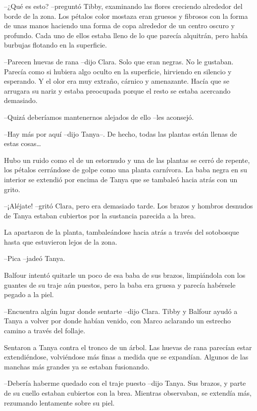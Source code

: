{--¿Qué es esto? --preguntó Tibby, examinando las flores creciendo
 alrededor del borde de la zona. Los pétalos color mostaza eran gruesos y
 fibrosos con la forma de unas manos haciendo una forma de copa alrededor
 de un centro oscuro y profundo. Cada uno de ellos estaba lleno de lo que
parecía alquitrán, pero había burbujas flotando en la superficie.}

{--Parecen huevas de rana --dijo Clara. Solo que eran negras. No le
 gustaban. Parecía como si hubiera algo oculto en la superficie,
 hirviendo en silencio y esperando. Y el olor era muy extraño, cárnico y
 amenazante. Hacía que se arrugara su nariz y estaba preocupada porque el
resto se estaba acercando demasiado.}

{--Quizá deberíamos mantenernos alejados de ello --les aconsejó.}

{--Hay más por aquí --dijo Tanya--. De hecho, todas las plantas están
 llenas de estas cosas\ldots{}}

{Hubo un ruido como el de un estornudo y una de las plantas se cerró de
 repente, los pétalos cerrándose de golpe como una planta carnívora. La
 baba negra en su interior se extendió por encima de Tanya que se
tambaleó hacia atrás con un grito.}

{--¡Aléjate! --gritó Clara, pero era demasiado tarde. Los brazos y
 hombros desnudos de Tanya estaban cubiertos por la sustancia parecida a
la brea.}

{La apartaron de la planta, tambaleándose hacia atrás a través del
sotobosque hasta que estuvieron lejos de la zona.}

{--Pica --jadeó Tanya.}

{Balfour intentó quitarle un poco de esa baba de sus brazos, limpiándola
 con los guantes de su traje aún puestos, pero la baba era gruesa y
parecía habérsele pegado a la piel.}

{--Encuentra algún lugar donde sentarte --dijo Clara. Tibby y Balfour
 ayudó a Tanya a volver por donde habían venido, con Marco aclarando un
estrecho camino a través del follaje.}

{Sentaron a Tanya contra el tronco de un árbol. Las huevas de rana
 parecían estar extendiéndose, volviéndose más finas a medida que se
 expandían. Algunos de las manchas más grandes ya se estaban
fusionando.}

{--Debería haberme quedado con el traje puesto --dijo Tanya. Sus brazos,
 y parte de su cuello estaban cubiertos con la brea. Mientras observaban,
se extendía más, rezumando lentamente sobre su piel.}

